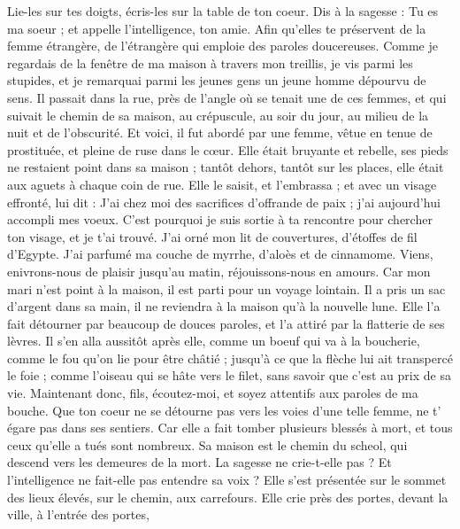 \begin{multicols}{2}
Lie-les sur tes doigts, écris-les sur la table de ton coeur.
Dis à la sagesse : Tu es ma soeur ; et appelle l'intelligence, ton amie.
Afin qu'elles te préservent de la femme étrangère, de l'étrangère qui emploie des paroles doucereuses.
Comme je regardais de la fenêtre de ma maison à travers mon treillis,
je vis parmi les stupides, et je remarquai parmi les jeunes gens un jeune homme dépourvu de sens.
Il passait dans la rue, près de l'angle où se tenait une de ces femmes, et qui suivait le chemin de sa maison,
au crépuscule, au soir du jour, au milieu de la nuit et de l'obscurité.
Et voici, il fut abordé par une femme, vêtue en tenue de prostituée, et pleine de ruse dans le cœur.
Elle était bruyante et rebelle, ses pieds ne restaient point dans sa maison ;
tantôt dehors, tantôt sur les places, elle était aux aguets à chaque coin de rue.
Elle le saisit, et l'embrassa ; et avec un visage effronté, lui dit :
J'ai chez moi des sacrifices d'offrande de paix ; j'ai aujourd'hui accompli mes voeux.
C'est pourquoi je suis sortie à ta rencontre pour chercher ton visage, et je t'ai trouvé.
J'ai orné mon lit de couvertures, d'étoffes de fil d'Egypte.
J'ai parfumé ma couche de myrrhe, d'aloès et de cinnamome.
Viens, enivrons-nous de plaisir jusqu'au matin, réjouissons-nous en amours.
Car mon mari n'est point à la maison, il est parti pour un voyage lointain.
Il a pris un sac d'argent dans sa main, il ne reviendra à la maison qu'à la nouvelle lune.
Elle l'a fait détourner par beaucoup de douces paroles, et l'a attiré par la flatterie de ses lèvres.
Il s'en alla aussitôt après elle, comme un boeuf qui va à la boucherie, comme le fou qu'on lie pour être châtié ;
jusqu'à ce que la flèche lui ait transpercé le foie ; comme l'oiseau qui se hâte vers le filet, sans savoir que c'est au prix de sa vie.
Maintenant donc, fils, écoutez-moi, et soyez attentifs aux paroles de ma bouche.
Que ton coeur ne se détourne pas vers les voies d'une telle femme, ne t' égare pas dans ses sentiers.
Car elle a fait tomber plusieurs blessés à mort, et tous ceux qu'elle a tués sont nombreux.
Sa maison est le chemin du scheol, qui descend vers les demeures de la mort.
\VerseOne{}La sagesse ne crie-t-elle pas ? Et l'intelligence ne fait-elle pas entendre sa voix ?
Elle s'est présentée sur le sommet des lieux élevés, sur le chemin, aux carrefours.
Elle crie près des portes, devant la ville, à l'entrée des portes,

\end{multicols}
